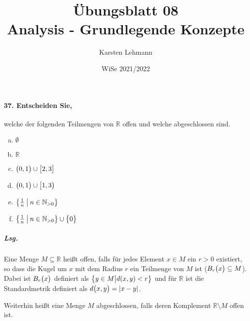\documentclass{scrreprt}
\author{Karsten Lehmann}
\date{WiSe 2021/2022}
\title{Übungsblatt 08\\Analysis - Grundlegende Konzepte}
\begin{document}
\paragraph{37. Entscheiden Sie,} welche der folgenden Teilmengen von
$\mathbb{R}$ offen und welche abgeschlossen sind.
\begin{multicols}{3}
  \begin{enumerate}[(a)]
  \item $\emptyset$
  \item $\mathbb{R}$
  \item $\qty\big(0, 1) \cup \qty\big[2, 3]$
  \item $\qty\big(0, 1) \cup {\big [}1, 3{\big )}$
  \item $\qty{\frac{1}{n} \: \middle | \: n \in \mathbb{N}_{> 0}}$
  \item $\qty{\frac{1}{n} \: \middle | \: n \in \mathbb{N}_{> 0}}
    \cup \qty\big{0}$
  \end{enumerate}
\end{multicols}

\subparagraph{Lsg.} Eine Menge $M \subseteq \mathbb{R}$ heißt offen, falls
für jedes Element $x \in M$ ein $r > 0$ existiert, so dass die Kugel um $x$
mit dem Radius $r$ ein Teilmenge von $M$ ist
($B_r\qty\big(x) \subseteq M$).
Dabei ist $B_r\qty\big(x)$ definiert als
$\qty\big{y \in M {\big |} d(x, y) < r}$ und für $\mathbb{R}$ ist die
Standardmetrik definiert als $d\qty\big(x, y) = \abs{x - y}$.

Weiterhin heißt eine Menge $M$ abgeschlossen, falls deren Komplement
$\mathbb{R} \setminus M$ offen ist.
\end{document}
